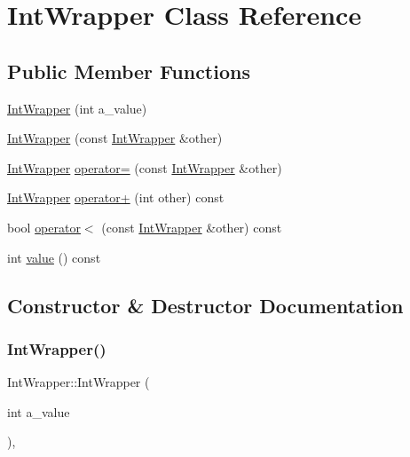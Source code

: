 \hypertarget{classIntWrapper}{}\section{Int\+Wrapper Class Reference}
\label{classIntWrapper}
\subsection*{Public Member Functions}
\begin{DoxyCompactItemize}
\item 
\mbox{\hyperlink{classIntWrapper_a1d35e0d0b9c0fc109a8d2a2118ae6010}{Int\+Wrapper}} (int a\+\_\+value)
\item 
\mbox{\hyperlink{classIntWrapper_af23efe3c8d8bf176948922b41e8f253e}{Int\+Wrapper}} (const \mbox{\hyperlink{classIntWrapper}{Int\+Wrapper}} \&other)
\item 
\mbox{\hyperlink{classIntWrapper}{Int\+Wrapper}} \mbox{\hyperlink{classIntWrapper_a39077b3c0eb1dd8a296a81bfb0a047b3}{operator=}} (const \mbox{\hyperlink{classIntWrapper}{Int\+Wrapper}} \&other)
\item 
\mbox{\hyperlink{classIntWrapper}{Int\+Wrapper}} \mbox{\hyperlink{classIntWrapper_abf97bd11dd2825f3cb9e4d9f48152b56}{operator+}} (int other) const
\item 
bool \mbox{\hyperlink{classIntWrapper_a940fd2978cdf7849281f11b32df94163}{operator$<$}} (const \mbox{\hyperlink{classIntWrapper}{Int\+Wrapper}} \&other) const
\item 
int \mbox{\hyperlink{classIntWrapper_a6103e9dc5eb94678985e3c2ac481b508}{value}} () const
\end{DoxyCompactItemize}


\subsection{Constructor \& Destructor Documentation}
\mbox{\label{classIntWrapper_a1d35e0d0b9c0fc109a8d2a2118ae6010}} 
\subsubsection{\texorpdfstring{IntWrapper()}{IntWrapper()}\hspace{0.1cm}{\footnotesize\ttfamily [1/2]}}
{\footnotesize\ttfamily Int\+Wrapper\+::\+Int\+Wrapper (\begin{DoxyParamCaption}\item[{int}]{a\+\_\+value }\end{DoxyParamCaption})\hspace{0.3cm}{\ttfamily [inline]}, {\ttfamily [explicit]}}


